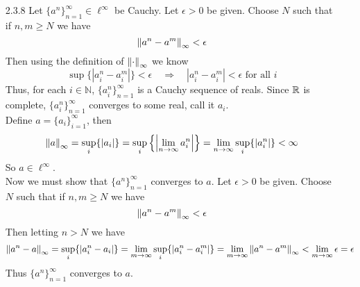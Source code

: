 \documentclass[../../Solutions.tex]{subfiles}
\begin{document}
\begin{itemize}
	\item [2.3.8] Let $\{a^n\}_{n=1}^\infty \in \ell^\infty$ be Cauchy.
		Let $\epsilon > 0$ be given.
		Choose $N$ such that if $n,m \geq N$ we have
		$$ \left\lVert a^n-a^m\right\rVert_\infty < \epsilon $$
		Then using the definition of $\left\lVert\cdot\right\rVert_\infty$ we know
		$$ \sup\{|a^n_i-a^m_i| \} < \epsilon \quad\Longrightarrow\quad |a^n_i-a^m_i| < \epsilon \text{ for all } i $$
		Thus, for each $i \in \mathbb{N}$, $\{a^n_i\}_{n=1}^\infty$ is a Cauchy sequence of reals.
		Since $\mathbb{R}$ is complete, $\{a^n_i\}_{n=1}^\infty$ converges to some real, call it $a_i$. \\
		Define $a = \{a_i\}_{i=1}^\infty$, then
		$$ \left\lVert a\right\rVert_\infty = \sup_i\{|a_i|\} = \sup_i\left\{\left|\lim_{n\to\infty}a^n_i\right|\right\}
			= \lim_{n\to\infty}\sup_i\{|a^n_i|\} < \infty $$
		So $a \in \ell^\infty$. \\
		Now we must show that $\{a^n\}_{n=1}^\infty$ converges to $a$.
		Let $\epsilon > 0$ be given.
		Choose $N$ such that if $n,m \geq N$ we have
		$$ \left\lVert a^n-a^m\right\rVert_\infty < \epsilon $$
		Then letting $n > N$ we have
		$$ \left\lVert a^n - a\right\rVert_\infty = \sup_i\{|a^n_i - a_i|\} = \lim_{m\to\infty}\sup_i\{|a^n_i-a^m_i|\} = \lim_{m\to\infty} \left\lVert a^n-a^m\right\rVert_\infty < \lim_{m\to\infty}\epsilon = \epsilon $$
		Thus $\{a^n\}_{n=1}^\infty$ converges to $a$.
	
\end{itemize}
\end{document}
